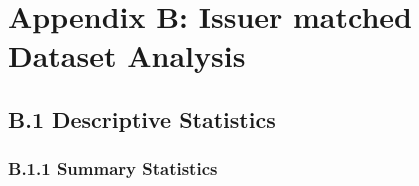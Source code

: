 %
%

\chapter{Appendix B: Issuer matched Dataset Analysis}
\label{app:app02}

\section{B.1 Descriptive Statistics}


\subsection{B.1.1 Summary Statistics}


